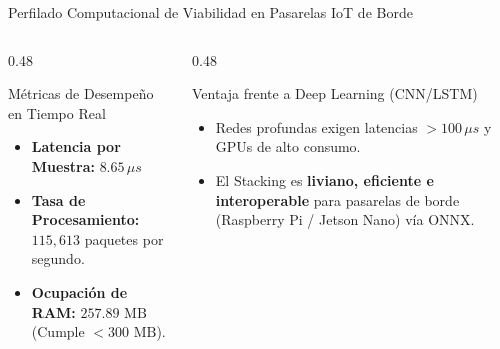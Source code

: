 \documentclass[10pt, aspectratio=169]{beamer}
\begin{document}
\begin{frame}{Perfilado Computacional de Viabilidad en Pasarelas IoT de Borde}
\begin{columns}
  \begin{column}{0.48\textwidth}
    \begin{block}{Métricas de Desempeño en Tiempo Real}
      \small
      \begin{itemize}
        \item \textbf{Latencia por Muestra:} $8.65\,\mu s$
        \item \textbf{Tasa de Procesamiento:} $115,613$ paquetes por segundo.
        \item \textbf{Ocupación de RAM:} $257.89\text{ MB}$ (Cumple $<300\text{ MB}$).
      \end{itemize}
    \end{block}
  \end{column}
  
  \begin{column}{0.48\textwidth}
    \begin{alertblock}{Ventaja frente a Deep Learning (CNN/LSTM)}
      \small
      \begin{itemize}
        \item Redes profundas exigen latencias $>100\,\mu s$ y GPUs de alto consumo.
        \item El Stacking es \textbf{liviano, eficiente e interoperable} para pasarelas de borde (Raspberry Pi / Jetson Nano) vía ONNX.
      \end{itemize}
    \end{alertblock}
  \end{column}
\end{columns}
\end{frame}
\end{document}
